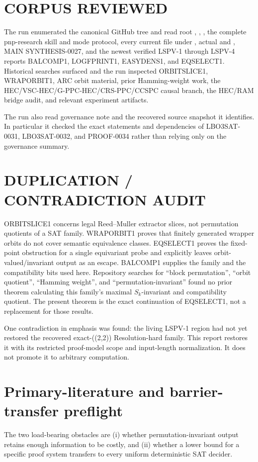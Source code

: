 \documentclass[11pt]{article}
\begin{document}
\section{CORPUS REVIEWED}
The run enumerated the canonical GitHub tree and read root ,
, , the complete pnp-research skill and mode
protocol, every current file under , actual  and
, MAIN SYNTHESIS-0027, and the newest verified LSPV-1 through
LSPV-4 reports BALCOMP1, LOGFPRINT1, EASYDENS1, and EQSELECT1.  Historical
searches surfaced and the run inspected ORBITSLICE1, WRAPORBIT1, ARC orbit
material, prior Hamming-weight work, the HEC/VSC-HEC/G-PPC-HEC/CRS-PPC/CCSPC
causal branch, the HEC/RAM bridge audit, and relevant experiment artifacts.

The run also read governance note
 and the
recovered source snapshot it identifies.  In particular it checked the exact
statements and dependencies of LBO3SAT-0031, LBO3SAT-0032, and PROOF-0034
rather than relying only on the governance summary.

\section{DUPLICATION / CONTRADICTION AUDIT}
ORBITSLICE1 concerns legal Reed--Muller extractor slices, not permutation
quotients of a SAT family.  WRAPORBIT1 proves that finitely generated wrapper
orbits do not cover semantic equivalence classes.  EQSELECT1 proves the
fixed-point obstruction for a single equivariant probe and explicitly leaves
orbit-valued/invariant output as an escape.  BALCOMP1 supplies the family and
the compatibility bits used here.  Repository searches for ``block
permutation'', ``orbit quotient'', ``Hamming weight'', and
``permutation-invariant'' found no prior theorem calculating this family's
maximal \(S_k\)-invariant and compatibility quotient.  The present theorem is
the exact continuation of EQSELECT1, not a replacement for those results.

One contradiction in emphasis was found: the living LSPV-1 region had not yet
restored the recovered exact-((2,2)) Resolution-hard family.  This report
restores it with its restricted proof-model scope and input-length
normalization.  It does not promote it to arbitrary computation.

\section{Primary-literature and barrier-transfer preflight}
The two load-bearing obstacles are (i) whether permutation-invariant output
retains enough information to be costly, and (ii) whether a lower bound for a
specific proof system transfers to every uniform deterministic SAT decider.
\end{document}
